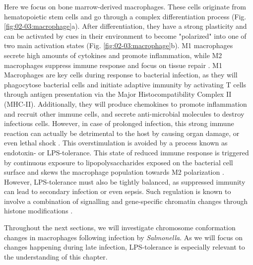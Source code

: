 Here we focus on bone marrow-derived macrophages. These cells originate from hematopoietic stem cells and go through a complex differentiation process (Fig. \ref{fig:02-03:macrophage}a). After differentiation, they have a strong plasticity and can be activated by cues in their environment to become "polarized" into one of two main activation states (Fig. \ref{fig:02-03:macrophage}b). M1 macrophages secrete high amounts of cytokines and promote inflammation, while M2 macrophages suppress immune response and focus on tissue repair \cite{ahmedM1M2Macrophages2020}. M1 Macrophages are key cells during response to bacterial infection, as they will phagocytose bacterial cells and initiate adaptive immunity by activating T cells through antigen presentation via the Major Histocompatibility Complex II (MHC-II). Additionally, they will produce chemokines to promote inflammation and recruit other immune cells, and secrete anti-microbial molecules to destroy infectious cells. However, in case of prolonged infection, this strong immune reaction can actually be detrimental to the host by causing organ damage, or even lethal shock \cite{magesGenomewideAnalysisLPS2008}. This overstimulation is avoided by a process known as endotoxin- or LPS-tolerance. This state of reduced immune response is triggered by continuous exposure to lipopolysaccharides exposed on the bacterial cell surface and skews the macrophage population towards M2 polarization \cite{portaToleranceM2Alternative2009}. However, LPS-tolerance must also be tightly balanced, as suppressed immunity can lead to secondary infection or even sepsis. Such regulation is known to involve a combination of signalling and gene-specific chromatin changes through histone modifications \cite{aungLPSRegulatesProinflammatory2006}.

 Throughout the next sections, we will investigate chromosome conformation changes in macrophages following infection by \textit{Salmonella}. As we will focus on changes happening during late infection, LPS-tolerance is especially relevant to the understanding of this chapter.

